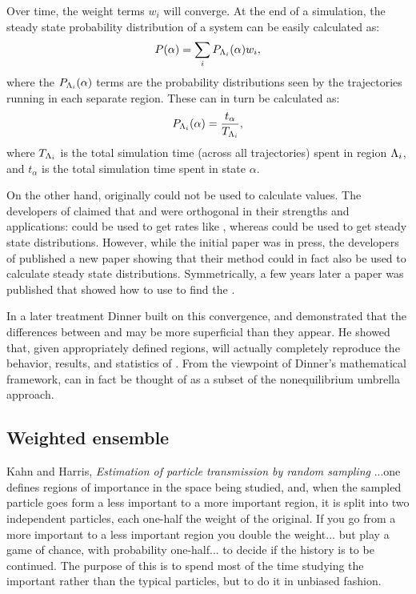Over time, the weight terms $w_i$ will converge\supercite{Dickson:2010gf}. At the end of a  simulation, the steady state probability distribution of a system can be easily calculated as:
\begin{equation*}
    P(\alpha) = \sum_{i} P_{\Lambda_{i}} (\alpha) w_i,
\end{equation*}
where the $P_{\Lambda_{i}} (\alpha)$ terms are the probability distributions seen by the trajectories running in each separate region. These can in turn be calculated as:
\begin{equation*}
    P_{\Lambda_{i}} (\alpha) = \frac{t_{\alpha}}{T_{\Lambda_{i}}},
\end{equation*}
where $T_{\Lambda_{i}}$ is the total simulation time (across all trajectories) spent in region $\Lambda_{i}$, and $t_{\alpha}$ is the total simulation time spent in state $\alpha$.

On the other hand,  originally could not be used to calculate  values. The developers of  claimed that  and  were orthogonal in their strengths and applications:  could be used to get rates like , whereas  could be used to get steady state distributions. However, while the initial  paper was in press, the developers of  published a new paper showing that their method could in fact also be used to calculate steady state distributions\supercite{Valeriani:2007hv}. Symmetrically, a few years later a paper was published that showed how to use  to find the \supercite{Dickson:2009fua}.


In a later treatment\supercite{Dickson:2010gf} Dinner built on this convergence, and demonstrated that the differences between  and  may be more superficial than they appear. He showed that, given appropriately defined regions,  will actually completely reproduce the behavior, results, and statistics of . From the viewpoint of Dinner's mathematical framework,  can in fact be thought of as a subset of the nonequilibrium umbrella approach.

\subsection{Weighted ensemble}

\begin{chapquote}{Kahn and Harris, \textit{Estimation of particle transmission by random sampling}\supercite{Kahn:1951es}}
...one defines regions of importance in the space being studied, and, when the sampled particle goes form a less important to a more important region, it is split into two independent particles, each one-half the weight of the original. If you go from a more important to a less important region you double the weight... but play a game of chance, with probability one-half... to decide if the history is to be continued. The purpose of this is to spend most of the time studying the important rather than the typical particles, but to do it in unbiased fashion.
\end{chapquote}

